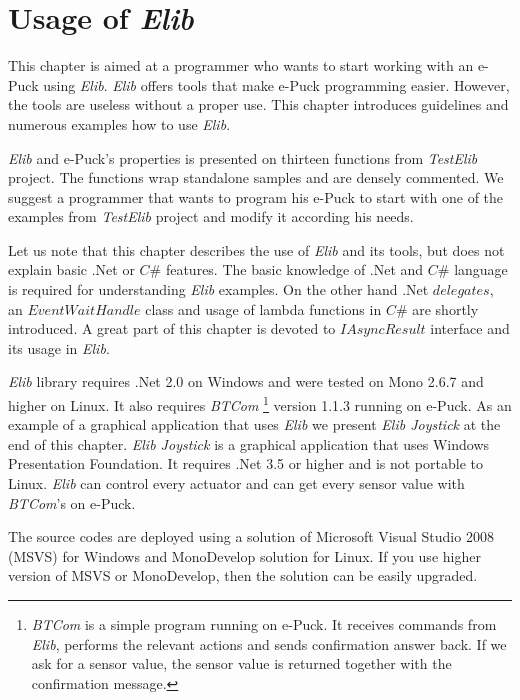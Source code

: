 \chapter{Usage of {\it Elib}} \label{chap:usage}
  This chapter is aimed at a programmer who wants to start working with an e-Puck using {\it Elib}. 
  {\it Elib} offers tools that make e-Puck programming easier. 
  However, the tools are useless without a proper use. 
  This chapter introduces guidelines and numerous
  examples how to use {\it Elib}.

  {\it Elib} and e-Puck's properties is presented on thirteen functions from {\it TestElib} project.
  The functions wrap standalone samples and are densely commented.
  We suggest a programmer that wants to program his e-Puck to start with one of the examples
  from {\it TestElib} project and modify it according his needs.

  Let us note that this chapter describes the use of {\it Elib} and its tools,
  but does not explain basic .Net or $C\#$ features. 
  The basic knowledge of .Net and $C\#$ language is required
  for understanding {\it Elib} examples. On the other hand .Net $delegates$, 
  an $EventWaitHandle$ class and usage of lambda functions in $C\#$
  are shortly introduced. A great part of this chapter is devoted to $IAsyncResult$ interface 
  and its usage in {\it Elib}.

  {\it Elib} library requires .Net 2.0 on Windows and were tested on Mono 2.6.7 
  and higher on Linux. It also requires {\it BTCom} 
  \footnote{ {\it BTCom} is a simple program running on e-Puck. 
  It receives commands from {\it Elib}, performs the relevant actions
  and sends confirmation answer back. If we ask for a sensor value, the sensor value is returned
  together with the confirmation message.
  }
  version 1.1.3 running on e-Puck.  
  As an example of a graphical application that uses {\it Elib} 
  we present {\it Elib Joystick} at the end of this chapter.
  {\it Elib Joystick} is a graphical application that uses Windows Presentation Foundation. 
  It requires .Net 3.5 or higher and is not portable to Linux.
  {\it Elib} can control every actuator and can get every sensor 
  value with {\it BTCom}'s  on e-Puck. 

  The source codes are deployed using a solution of Microsoft Visual Studio 2008 (MSVS) for Windows 
  and MonoDevelop solution for Linux.
  If you use higher version of MSVS or MonoDevelop, then the solution can be easily upgraded.	

